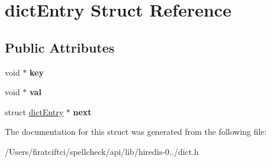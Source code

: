 \hypertarget{structdict_entry}{}\section{dict\+Entry Struct Reference}
\label{structdict_entry}
\subsection*{Public Attributes}
\begin{DoxyCompactItemize}
\item 
\mbox{\label{structdict_entry_a1cc436243330e4ac0a1d7d07e5a16ce0}} 
void $\ast$ {\bfseries key}
\item 
\mbox{\label{structdict_entry_a30f939fb9c159fefaaec4907e582b417}} 
void $\ast$ {\bfseries val}
\item 
\mbox{\label{structdict_entry_ae3d8892babea304bd7e2aded824586dd}} 
struct \mbox{\hyperlink{structdict_entry}{dict\+Entry}} $\ast$ {\bfseries next}
\end{DoxyCompactItemize}


The documentation for this struct was generated from the following file\+:\begin{DoxyCompactItemize}
\item 
/\+Users/firatciftci/spellcheck/api/lib/hiredis-\/0../dict.\+h\end{DoxyCompactItemize}
